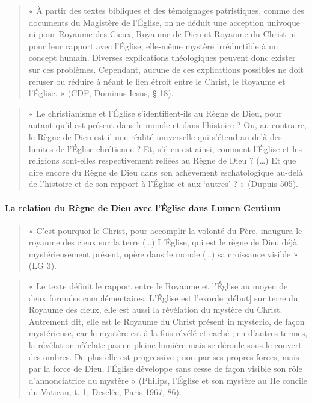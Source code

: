 \begin{quote}
    « À partir des textes bibliques et des témoignages patristiques, comme des documents du Magistère de l'Église, on ne déduit une acception univoque ni pour Royaume des Cieux, Royaume de Dieu et Royaume du Christ ni pour leur rapport avec l'Église, elle-même mystère irréductible à un concept humain. Diverses explications théologiques peuvent donc exister sur ces problèmes. Cependant, aucune de ces explications possibles ne doit refuser ou réduire à néant le lien étroit entre le Christ, le Royaume et l'Église. » (CDF, Dominus Iesus, § 18). 
\end{quote}

\begin{quote}
    « Le christianisme et l’Église s’identifient-ils au Règne de Dieu, pour autant qu’il est présent dans le monde et dans l’histoire ? Ou, au contraire, le Règne de Dieu est-il une réalité universelle qui s’étend au-delà des limites de l’Église chrétienne ? Et, s’il en est ainsi, comment l’Église et les religions sont-elles respectivement reliées au Règne de Dieu ? (…) Et que dire encore du Règne de Dieu dans son achèvement eschatologique au-delà de l’histoire et de son rapport à l’Église et aux ‘autres’ ? » (Dupuis 505). 
\end{quote}
\paragraph{La relation du Règne de Dieu avec l’Église dans Lumen Gentium } 
\begin{quote}
    « C’est pourquoi le Christ, pour accomplir la volonté du Père, inaugura le royaume des cieux sur la terre (…) L’Église, qui est le règne de Dieu déjà mystérieusement présent, opère dans le monde (…) sa croissance visible » (LG 3).  
\end{quote}

\begin{quote}
    « Le texte définit le rapport entre le Royaume et l’Église au moyen de deux formules complémentaires. L’Église est l’exorde [début] sur terre du Royaume des cieux, elle est aussi la révélation du mystère du Christ. Autrement dit, elle est le Royaume du Christ présent in mysterio, de façon mystérieuse, car le mystère est à la fois révélé et caché ; en d’autres termes, la révélation n’éclate pas en pleine lumière mais se déroule sous le couvert des ombres. De plus elle est progressive ; non par ses propres forces, mais par la force de Dieu, l’Église développe sans cesse de façon visible son rôle d’annonciatrice du mystère »  (Philips, l’Église et son mystère au IIe concile du Vatican, t. 1, Desclée, Paris 1967, 86). 
\end{quote}

